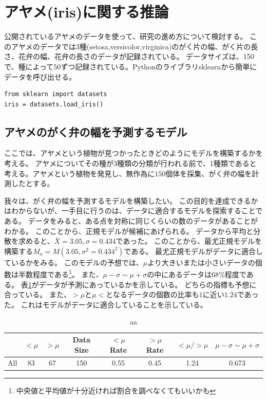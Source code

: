 \section{アヤメ(iris)に関する推論}
公開されているアヤメのデータを使って、研究の進め方について検討する。
このアヤメのデータでは$3$種(setosa,versicolor,virginica)のがく片の幅、がく片の長さ、花弁の幅、花弁の長さのデータが記録されている。
データサイズは、150で、種によって$50$ずつ記録されている。Pythonのライブラリsklearnから簡単にデータを呼び出せる。
\begin{lstlisting}
from sklearn import datasets
iris = datasets.load_iris()
\end{lstlisting}

\subsection{アヤメのがく弁の幅を予測するモデル}
ここでは、アヤメという植物が見つかったときどのようにモデルを構築するかを考える。
アヤメについてその種が3種類の分類が行われる前で、1種類であると考える。アヤメという植物を発見し、無作為に$150$個体を採集、がく弁の幅を計測したとする。

我々は、がく弁の幅を予測するモデルを構築したい。
この目的を達成できるかはわからないが、一手目に行うのは、データに適合するモデルを探索することである。
データをみると、ある点を対称に同じくらいの数のデータがあることがわかる。
このことから、正規モデルが候補にあげられる。
データから平均と分散を求めると、$\bar{X}=3.05,\sigma=0.434$であった。
このことから、最尤正規モデルを構築する$M_a=M(3.05,\sigma^2=0.434^2)$である。
最尤正規モデルがデータに適合しているかをみる。
このモデルの予想では、$\mu$より大きいまたは小さいデータの個数は半数程度である\footnote{中央値と平均値が十分近ければ割合を調べなくてもいいかも}。
また、$\mu-\sigma \sim \mu+\sigma$の中にあるデータは$68\%$程度である。
表\ref{table:all_spael_width_table}がデータが予測にあっているかを示している。
どちらの指標も予想に合っている。
また、$>\mu$と$\mu<$となるデータの個数の比率も$1$に近い$1.24$であった。
これはモデルがデータに適合していることを示している。
\begin{table}[h]
    \caption{aa}
    \label{table:all_spael_width_table}
    \centering
    \begin{tabular}{lccccccc}
        \hline
        {} &  $<\mu$ &  $>\mu$ &  Data Size &  $<\mu$ Rate &  $>\mu$ Rate &  $<\mu/>\mu$ & $\mu-\sigma\sim\mu+\sigma$\\
        \hline
        All    &    83 &    67 &        150 &       0.55 &       0.45 &       1.24 & 0.673\\
        \hline
    \end{tabular}
\end{table}

